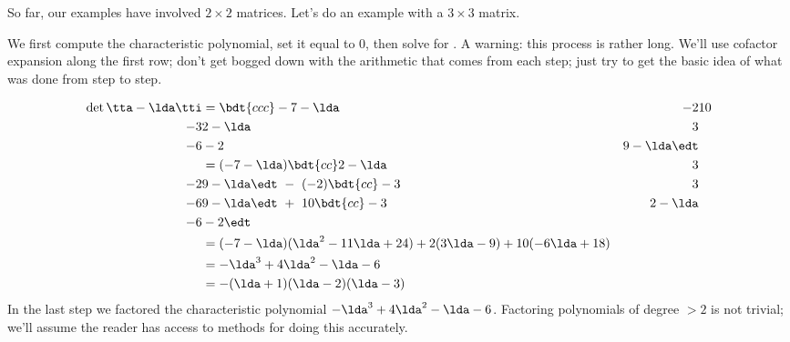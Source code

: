 \medskip

So far, our examples have involved $2\times 2$ matrices. Let's do an example with a $3\times 3$ matrix.

\medskip

{We first compute the characteristic polynomial, set it equal to 0, then solve for \lda. A warning: this process is rather long. We'll use cofactor expansion along the first row; don't get bogged down with the arithmetic that comes from each step; just try to get the basic idea of what was done from step to step.



\begin{align*}
\det{\tta-\lda\tti} &= \bdt{ccc} -7-\lda & -2 & 10 \\-3 & 2-\lda & 3\\ -6 & -2 & 9-\lda \edt \\
										&= (-7-\lda)\bdt{cc}2-\lda & 3\\-2 & 9-\lda\edt\ -\ (-2)\bdt{cc} -3&3\\-6 & 9-\lda \edt\ +\ 10\bdt{cc} -3&2-\lda \\-6 & -2 \edt \\
										&= (-7-\lda)(\lda^2-11\lda + 24) + 2(3\lda-9)+10(-6\lda+18)\\
										&= -\lda^3+4\lda^2-\lda -6\\
										&= -(\lda + 1)(\lda-2)(\lda-3)
\end{align*}
In the last step we factored the characteristic polynomial $-\lda^3+4\lda^2-\lda -6$. Factoring polynomials of degree $>2$ is not trivial; we'll assume the reader has access to methods for doing this accurately. 

}
